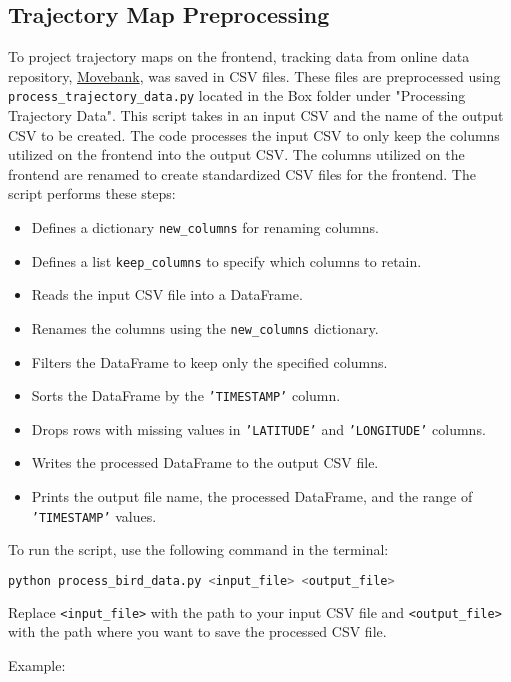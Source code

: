 \documentclass{article}
\begin{document}
\subsection*{Trajectory Map Preprocessing}
To project trajectory maps on the frontend, tracking data from online data repository, \href{https://www.movebank.org/cms/movebank-main} {Movebank}, was saved in CSV files. These files are preprocessed using \texttt{process\_trajectory\_data.py} located in the Box folder under "Processing Trajectory Data". This script takes in an input CSV and the name of the output CSV to be created.
The code processes the input CSV to only keep the columns utilized on the frontend into the output CSV. The columns utilized on the frontend are renamed to create standardized CSV files for the frontend. The script performs these steps:
\begin{itemize}
    \item Defines a dictionary \texttt{new\_columns} for renaming columns.
    \item Defines a list \texttt{keep\_columns} to specify which columns to retain.
    \item Reads the input CSV file into a DataFrame.
    \item Renames the columns using the \texttt{new\_columns} dictionary.
    \item Filters the DataFrame to keep only the specified columns.
    \item Sorts the DataFrame by the \texttt{'TIMESTAMP'} column.
    \item Drops rows with missing values in \texttt{'LATITUDE'} and \texttt{'LONGITUDE'} columns.
    \item Writes the processed DataFrame to the output CSV file.
    \item Prints the output file name, the processed DataFrame, and the range of \texttt{'TIMESTAMP'} values.
\end{itemize}

To run the script, use the following command in the terminal:

\begin{lstlisting}[language=bash]
python process_bird_data.py <input_file> <output_file>
\end{lstlisting}

Replace \texttt{<input\_file>} with the path to your input CSV file and \texttt{<output\_file>} with the path where you want to save the processed CSV file.

Example:
\end{document}
